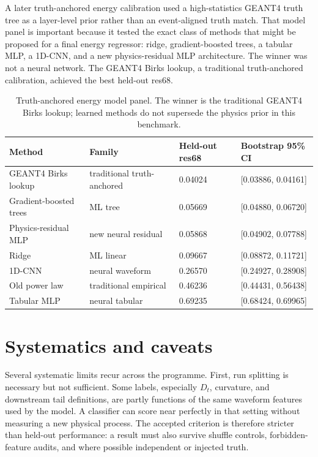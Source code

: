A later truth-anchored energy calibration used a high-statistics GEANT4 truth tree as
a layer-level prior rather than an event-aligned truth match.  That model panel is
important because it tested the exact class of methods that might be proposed for a
final energy regressor: ridge, gradient-boosted trees, a tabular MLP, a 1D-CNN, and a
new physics-residual MLP architecture.  The winner was not a neural network.  The
GEANT4 Birks lookup, a traditional truth-anchored calibration, achieved the best
held-out res68.

\begin{table}[H]
  \centering
  \scriptsize
  \begin{tabular}{llll}
    \toprule
    Method & Family & Held-out res68 & Bootstrap 95\% CI \\
    \midrule
    GEANT4 Birks lookup & traditional truth-anchored & 0.04024 & [0.03886, 0.04161] \\
    Gradient-boosted trees & ML tree & 0.05669 & [0.04880, 0.06720] \\
    Physics-residual MLP & new neural residual & 0.05868 & [0.04902, 0.07788] \\
    Ridge & ML linear & 0.09667 & [0.08872, 0.11721] \\
    1D-CNN & neural waveform & 0.26570 & [0.24927, 0.28908] \\
    Old power law & traditional empirical & 0.46236 & [0.44431, 0.56438] \\
    Tabular MLP & neural tabular & 0.69235 & [0.68424, 0.69965] \\
    \bottomrule
  \end{tabular}
  \caption{Truth-anchored energy model panel.  The winner is the traditional GEANT4 Birks lookup; learned methods do not supersede the physics prior in this benchmark.}
\end{table}

\section{Systematics and caveats}

Several systematic limits recur across the programme.  First, run splitting is
necessary but not sufficient.  Some labels, especially \(D_t\), curvature, and
downstream tail definitions, are partly functions of the same waveform features used
by the model.  A classifier can score near perfectly in that setting without
measuring a new physical process.  The accepted criterion is therefore stricter than
held-out performance: a result must also survive shuffle controls, forbidden-feature
audits, and where possible independent or injected truth.

